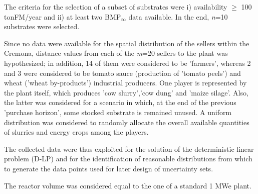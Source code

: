 The criteria for the selection of a subset of substrates were i) availability $\geq$ 100 tonFM/year and ii) at least two BMP$_{\infty}$ data available. In the end, \emph{n}=10 substrates were selected.

Since no data were available for the spatial distribution of the sellers within the Cremona, distance values from each of the \emph{m}=20 sellers to the plant was hypothesized; in addition, 14 of them were considered to be 'farmers', whereas 2 and 3 were considered  to be tomato sauce (production of 'tomato peels') and wheat ('wheat by-products') industrial producers. One player is represented by the plant itself, which produces 'cow slurry','cow dung' and 'maize silage'. Also, the latter was considered for a scenario in which, at the end of the previous 'purchase horizon', some stocked substrate is remained unused. 
A uniform distribution was considered to randomly allocate the overall available quantities of slurries and energy crops among the players. 

The collected data were thus exploited for the solution of the deterministic linear problem (D-LP) and for the identification of reasonable distributions from which to generate the data points used for later design of uncertainty sets.

The reactor volume was considered equal to the one of a standard 1 MWe plant. 
